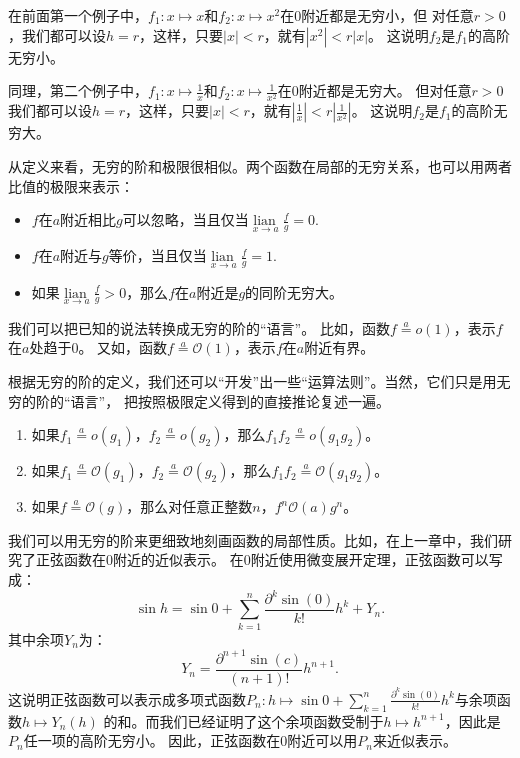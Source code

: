 \documentclass[12pt,UTF8]{ctexbook}
\newcommand{\lian}[1]{
    \underset{#1}{\operatorname{lian}\,}
}
\newcommand{\oveq}[1]{\overset{#1}{=}}
\newcommand{\olim}[1]{\mathit{o}\left(#1\right)}  %
\newcommand{\Olim}[1]{\mathcal{O}\left(#1\right)}  %
\theoremstyle{definition}
\theoremstyle{plain}
\begin{document}
在前面第一个例子中，$f_1: x\mapsto x$和$f_2: x\mapsto x^2$在$0$附近都是无穷小，但
对任意$r > 0$，我们都可以设$h = r$，这样，只要$|x| < r$，就有$|x^2| < r|x|$。
这说明$f_2$是$f_1$的高阶无穷小。

同理，第二个例子中，$f_1: x\mapsto \frac{1}{x}$和$f_2: x\mapsto \frac{1}{x^2}$在$0$附近都是无穷大。
但对任意$r > 0$我们都可以设$h = r$，这样，只要$|x| < r$，就有$|\frac{1}{x}| < r|\frac{1}{x^2}|$。
这说明$f_2$是$f_1$的高阶无穷大。

从定义来看，无穷的阶和极限很相似。两个函数在局部的无穷关系，也可以用两者比值的极限来表示：
\begin{itemize}
    \item $f$在$a$附近相比$g$可以忽略，当且仅当$\lian{x\to a} \frac{f}{g} = 0.$
    \item $f$在$a$附近与$g$等价，当且仅当$\lian{x\to a} \frac{f}{g} = 1.$
    \item 如果$\lian{x\to a} \frac{f}{g} > 0$，那么$f$在$a$附近是$g$的同阶无穷大。
\end{itemize}

我们可以把已知的说法转换成无穷的阶的“语言”。
比如，函数$f \oveq{a} \olim{1}$，表示$f$在$a$处趋于$0$。
又如，函数$f \oveq{a} \Olim{1}$，表示$f$在$a$附近有界。

根据无穷的阶的定义，我们还可以“开发”出一些“运算法则”。当然，它们只是用无穷的阶的“语言”，
把按照极限定义得到的直接推论复述一遍。
\begin{enumerate}
    \item 如果$f_1 \oveq{a} \olim{g_1}$，$f_2 \oveq{a} \olim{g_2}$，那么$f_1 f_2 \oveq{a} \olim{g_1 g_2}$。
    \item 如果$f_1 \oveq{a} \Olim{g_1}$，$f_2 \oveq{a} \Olim{g_2}$，那么$f_1 f_2 \oveq{a} \Olim{g_1 g_2}$。
    \item 如果$f \oveq{a} \Olim{g}$，那么对任意正整数$n$，$f^n \Olim{a}{g^n}$。
\end{enumerate}

我们可以用无穷的阶来更细致地刻画函数的局部性质。比如，在上一章中，我们研究了正弦函数在$0$附近的近似表示。
在$0$附近使用微变展开定理，正弦函数可以写成：
$$ \sin{h} = \sin{0} + \sum_{k=1}^n \frac{\partial^k \sin (0)}{k!}h^k + Y_n. $$
其中余项$Y_n$为：
$$ Y_n = \frac{\partial^{n+1} \sin (c)}{(n+1)!}h^{n+1}. $$
这说明正弦函数可以表示成多项式函数$P_n :h \mapsto \sin{0} + \sum_{k=1}^n \frac{\partial^k \sin (0)}{k!}h^k$与余项函数$h\mapsto Y_n(h)$
的和。而我们已经证明了这个余项函数受制于$h\mapsto h^{n+1}$，因此是$P_n$任一项的高阶无穷小。
因此，正弦函数在$0$附近可以用$P_n$来近似表示。
\end{document}
